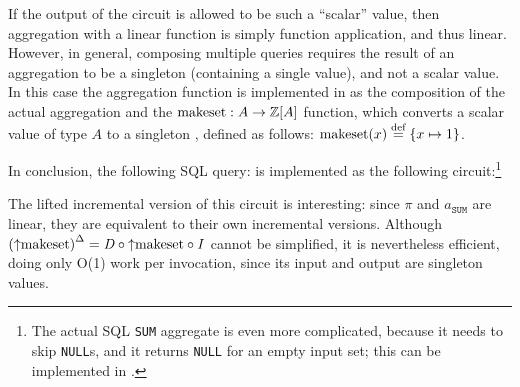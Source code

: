 If the output of the \dbsp circuit is allowed to be such a ``scalar'' value, then aggregation
with a linear function is simply function application, and thus linear.
However, in general, composing multiple queries
requires the result of an aggregation to be a singleton \zr (containing a single value),
and not a scalar value.  In this case the aggregation function is implemented in
\dbsp as the composition of the actual aggregation and the
$\mbox{makeset}: A \to \mathbb{Z}[A]$ function,
which converts a scalar value of type $A$ to a singleton \zr, defined as follows:
$\mbox{makeset}(x) \stackrel{\textrm{\scriptsize def}}{=} \{ x \mapsto 1 \}$.

In conclusion, the following SQL query:
is implemented as the following circuit:\footnote{The actual SQL \texttt{SUM} aggregate is
even more complicated, because it needs to skip \texttt{NULL}s,
and it returns \texttt{NULL} for an empty input set;
this can be implemented in \dbsp.}


The lifted incremental version of this circuit is interesting: since $\pi$
and $a_\texttt{SUM}$ are linear, they are equivalent to their own incremental
versions.  Although ${({\uparrow}\mbox{makeset})}^{\Delta} = \mathit{D} \circ {\uparrow}\mbox{makeset} \circ \mathit{I}$
cannot be simplified, it is nevertheless efficient, doing only O(1) work per
invocation, since its input and output are singleton values.


%

